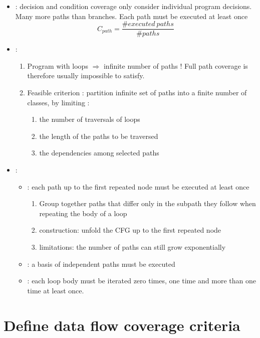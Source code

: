 \begin{itemize}
    \item {} : decision and condition coverage only consider individual program decisions. Many more paths than branches. Each path must be executed at least once
    $$C_{path} = \frac{\#executed\ paths}{\#paths}$$
    \item {} :
    \begin{enumerate}
        \item Program with loops $\Rightarrow$ infinite number of paths ! Full path coverage is therefore usually impossible to satisfy.
        \item Feasible criterion : partition infinite set of paths into a finite number of classes, by limiting :
        \begin{enumerate}
            \item the number of traversals of loops
            \item the length of the paths to be traversed
            \item the dependencies among selected paths
        \end{enumerate}
    \end{enumerate}
    \item {} :
    \begin{itemize}
        \item {} : each path up to the first repeated node must be executed at least once
        \begin{enumerate}
            \item Group together paths that differ only in the subpath they follow when repeating the body of a loop
            \item construction: unfold the CFG up to the first repeated node
            \item limitations: the number of paths can still grow exponentially
        \end{enumerate}
        \item {}: a basis of independent paths must be executed
        \item {}: each loop body must be iterated zero times, one time and more than one time at least once.
    \end{itemize}
\end{itemize}

\section{Define data flow coverage criteria}

